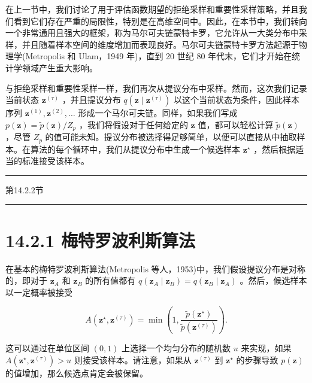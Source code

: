 \documentclass[10pt]{article}
\newcommand{\HRule}{\begin{center}\rule{0.9\linewidth}{0.2mm}\end{center}}
\begin{document}
在上一节中，我们讨论了用于评估函数期望的拒绝采样和重要性采样策略，并且我们看到它们存在严重的局限性，特别是在高维空间中。因此，在本节中，我们转向一个非常通用且强大的框架，称为马尔可夫链蒙特卡罗，它允许从一大类分布中采样，并且随着样本空间的维度增加而表现良好。马尔可夫链蒙特卡罗方法起源于物理学(Metropolis 和 Ulam，1949 年)，直到 20 世纪 80 年代末，它们才开始在统计学领域产生重大影响。

与拒绝采样和重要性采样一样，我们再次从提议分布中采样。然而，这次我们记录当前状态 \({\mathbf{z}}^{\left( \tau \right) }\) ，并且提议分布 \(q\left( {\mathbf{z} \mid  {\mathbf{z}}^{\left( \tau \right) }}\right)\) 以这个当前状态为条件，因此样本序列 \({\mathbf{z}}^{\left( 1\right) },{\mathbf{z}}^{\left( 2\right) },\ldots\) 形成一个马尔可夫链。同样，如果我们写成 \(p\left( \mathbf{z}\right)  = \widetilde{p}\left( \mathbf{z}\right) /{Z}_{p}\) ，我们将假设对于任何给定的 \(\mathbf{z}\) 值，都可以轻松计算 \(\widetilde{p}\left( \mathbf{z}\right)\) ，尽管 \({Z}_{p}\) 的值可能未知。提议分布被选择得足够简单，以便可以直接从中抽取样本。在算法的每个循环中，我们从提议分布中生成一个候选样本 \({\mathbf{z}}^{ \star  }\) ，然后根据适当的标准接受该样本。

\HRule

第14.2.2节

\HRule

\section*{14.2.1 梅特罗波利斯算法}

在基本的梅特罗波利斯算法(Metropolis 等人，1953)中，我们假设提议分布是对称的，即对于 \({\mathbf{z}}_{A}\) 和 \({\mathbf{z}}_{B}\) 的所有值都有 \(q\left( {{\mathbf{z}}_{A} \mid  {\mathbf{z}}_{B}}\right)  = q\left( {{\mathbf{z}}_{B} \mid  {\mathbf{z}}_{A}}\right)\) 。然后，候选样本以一定概率被接受

\[
A\left( {{\mathbf{z}}^{ \star  },{\mathbf{z}}^{\left( \tau \right) }}\right)  = \min \left( {1,\frac{\widetilde{p}\left( {\mathbf{z}}^{ \star  }\right) }{\widetilde{p}\left( {\mathbf{z}}^{\left( \tau \right) }\right) }}\right) . \tag{14.27}
\]

这可以通过在单位区间 \(\left( {0,1}\right)\) 上选择一个均匀分布的随机数 \(u\) 来实现，如果 \(A\left( {{\mathbf{z}}^{ \star  },{\mathbf{z}}^{\left( \tau \right) }}\right)  > u\) 则接受该样本。请注意，如果从 \({\mathbf{z}}^{\left( \tau \right) }\) 到 \({\mathbf{z}}^{ \star  }\) 的步骤导致 \(p\left( \mathbf{z}\right)\) 的值增加，那么候选点肯定会被保留。
\end{document}
